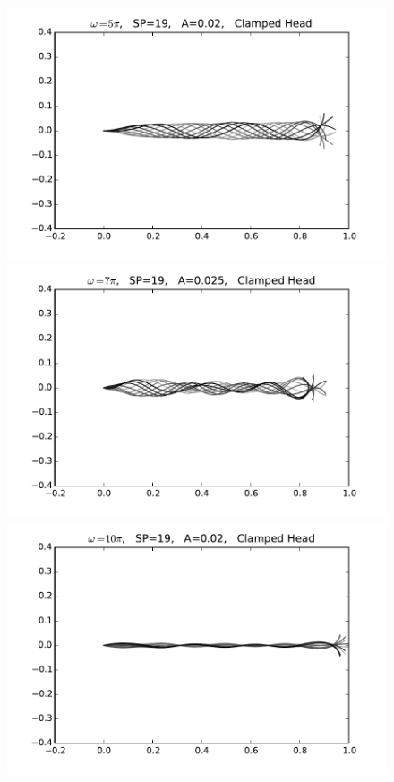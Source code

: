 \documentclass[12pt]{article}
\begin{document}
\begin{figure}
  \includegraphics[width=.3\textwidth]{clamped_19_5}
  \hfill
  \includegraphics[width=.3\textwidth]{clamped_19_7}
  \hfill
  \includegraphics[width=.3\textwidth]{clamped_19_10}
  \label{fig:clamped-head}
\end{figure}
\end{document}
